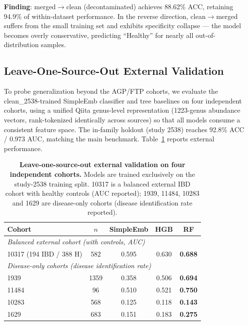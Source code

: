 \documentclass{article} %
\begin{document}
\textbf{Finding}: merged$\rightarrow$clean (decontaminated) achieves 88.62\% ACC, retaining 94.9\% of within-dataset performance. In the reverse direction, clean$\rightarrow$merged suffers from the small training set and exhibits specificity collapse --- the model becomes overly conservative, predicting ``Healthy'' for nearly all out-of-distribution samples.


\subsection{Leave-One-Source-Out External Validation}

To probe generalization beyond the AGP/FTP cohorts, we evaluate the clean\_2538-trained SimpleEmb classifier and tree baselines on four independent cohorts, using a unified Qiita genus-level representation (1223-genus abundance vectors, rank-tokenized identically across sources) so that all models consume a consistent feature space. The in-family holdout (study 2538) reaches 92.8\% ACC / 0.973 AUC, matching the main benchmark. Table~\ref{tab:external} reports external performance.

\begin{table}[ht]
\centering
\caption{\textbf{Leave-one-source-out external validation on four independent cohorts.}
Models are trained exclusively on the study-2538 training split. 10317 is a balanced external IBD cohort with healthy controls (AUC reported); 1939, 11484, 10283 and 1629 are disease-only cohorts (disease identification rate reported).}
\label{tab:external}
\begin{tabular}{lcccc}
\toprule
\textbf{Cohort} & \textbf{$n$} & \textbf{SimpleEmb} & \textbf{HGB} & \textbf{RF} \\
\midrule
\multicolumn{5}{l}{\textit{Balanced external cohort (with controls, AUC)}} \\
10317 (194 IBD / 388 H) & 582 & 0.595 & 0.630 & \textbf{0.688} \\
\midrule
\multicolumn{5}{l}{\textit{Disease-only cohorts (disease identification rate)}} \\
1939 & 1359 & 0.358 & 0.506 & \textbf{0.694} \\
11484 & 96 & 0.510 & 0.521 & \textbf{0.750} \\
10283 & 568 & 0.125 & 0.118 & \textbf{0.143} \\
1629 & 683 & 0.151 & 0.183 & \textbf{0.275} \\
\bottomrule
\end{tabular}
\end{table}
\end{document}
